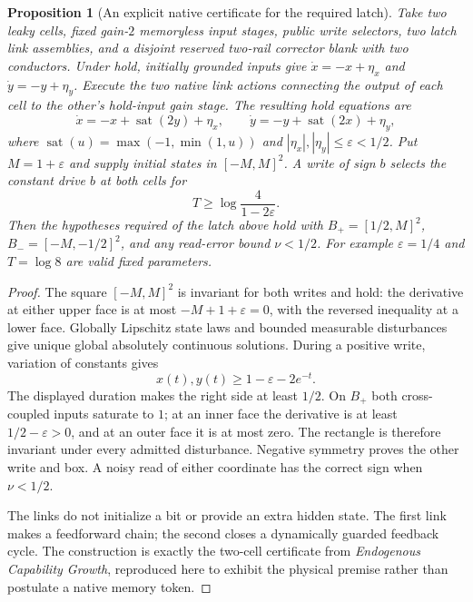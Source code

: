 \documentclass[11pt]{article}
\newtheorem{proposition}[theorem]{Proposition}
\theoremstyle{definition}
\theoremstyle{remark}
\begin{document}
\begin{proposition}[An explicit native certificate for the required latch]
\label{arc:prop:latch-certificate}
Take two leaky cells, fixed gain-$2$ memoryless input stages, public write
selectors, two latch link assemblies, and a disjoint reserved two-rail
corrector blank with two conductors. Under hold, initially grounded
inputs give $\dot x=-x+\eta_x$ and $\dot y=-y+\eta_y$. Execute the two native
link actions connecting the output of each cell to the other's hold-input
gain stage. The resulting hold equations are
\[
 \dot x=-x+\operatorname{sat}(2y)+\eta_x,
 \qquad
 \dot y=-y+\operatorname{sat}(2x)+\eta_y,
\]
where $\operatorname{sat}(u)=\max(-1,\min(1,u))$ and
$|\eta_x|,|\eta_y|\leq\varepsilon<1/2$. Put $M=1+\varepsilon$ and supply
initial states in $[-M,M]^2$. A write of sign $b$ selects the constant drive
$b$ at both cells for
\[
                  T\geq\log\frac{4}{1-2\varepsilon}.
\]
Then the hypotheses required of the latch above hold with
$B_+=[1/2,M]^2$, $B_-=[-M,-1/2]^2$, and any read-error bound $\nu<1/2$.
For example $\varepsilon=1/4$ and $T=\log 8$ are valid fixed parameters.
\end{proposition}
\begin{proof}
The square $[-M,M]^2$ is invariant for both writes and hold: the derivative
at either upper face is at most $-M+1+\varepsilon=0$, with the reversed
inequality at a lower face. Globally Lipschitz state laws and bounded
measurable disturbances give unique global absolutely continuous
solutions. During a positive write, variation of constants gives
\[
          x(t),y(t)\geq1-\varepsilon-2e^{-t}.
\]
The displayed duration makes the right side at least $1/2$. On $B_+$ both
cross-coupled inputs saturate to $1$; at an inner face the derivative is
at least $1/2-\varepsilon>0$, and at an outer face it is at most zero.
The rectangle is therefore invariant under every admitted disturbance.
Negative symmetry proves the other write and box. A noisy read of either
coordinate has the correct sign when $\nu<1/2$.

The links do not initialize a bit or provide an extra hidden state. The
first link makes a feedforward chain; the second closes a dynamically
guarded feedback cycle. The construction is exactly the two-cell
certificate from \emph{Endogenous Capability Growth}, reproduced here
to exhibit the physical premise rather than postulate a native memory
token.
\end{proof}
\end{document}
